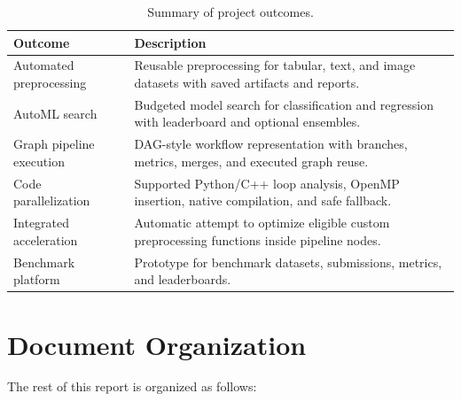 \documentclass[12pt,a4paper]{report}
\begin{document}
\begin{table}[!htbp]
\centering
\caption{Summary of project outcomes.}
\label{tab:intro-outcomes}
\small
\renewcommand{\arraystretch}{1.12}
\setlength{\tabcolsep}{4pt}
\begin{tabular}{p{}p{}}
\toprule
Outcome & Description \\
\midrule
Automated preprocessing &
Reusable preprocessing for tabular, text, and image datasets with saved
artifacts and reports. \\

AutoML search &
Budgeted model search for classification and regression with leaderboard and
optional ensembles. \\

Graph pipeline execution &
DAG-style workflow representation with branches, metrics, merges, and executed
graph reuse. \\

Code parallelization &
Supported Python/C++ loop analysis, OpenMP insertion, native compilation, and
safe fallback. \\

Integrated acceleration &
Automatic attempt to optimize eligible custom preprocessing functions inside
pipeline nodes. \\

Benchmark platform &
Prototype for benchmark datasets, submissions, metrics, and leaderboards. \\
\bottomrule
\end{tabular}
\renewcommand{\arraystretch}{1.0}
\end{table}

\section{Document Organization}

The rest of this report is organized as follows:
\end{document}
